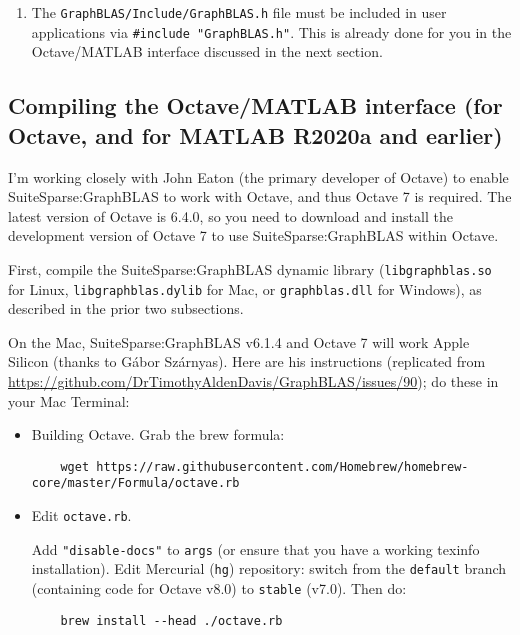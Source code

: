 \documentclass[12pt]{article}
\begin{document}
{\begin{enumerate}
\item The \verb'GraphBLAS/Include/GraphBLAS.h' file must be included in user
    applications via \verb'#include "GraphBLAS.h"'.  This is already done for
    you in the Octave/MATLAB interface discussed in the next section.

\end{enumerate}

\subsection{Compiling the Octave/MATLAB interface (for Octave, and for MATLAB R2020a and earlier)}
\label{gbmake}

I'm working closely with John Eaton (the primary developer of Octave) to
enable SuiteSparse:GraphBLAS to work with Octave, and thus Octave 7 is
required.  The latest version of Octave is 6.4.0, so you need to download and
install the development version of Octave 7 to use SuiteSparse:GraphBLAS within
Octave.

First, compile the SuiteSparse:GraphBLAS dynamic library
(\verb'libgraphblas.so' for Linux, \verb'libgraphblas.dylib' for Mac,
or \verb'graphblas.dll' for Windows), as described in the prior two
subsections.

On the Mac, SuiteSparse:GraphBLAS v6.1.4 and Octave 7 will work 
Apple Silicon (thanks to G{\'{a}}bor Sz{\'{a}}rnyas).  Here are his instructions
(replicated from
\url{https://github.com/DrTimothyAldenDavis/GraphBLAS/issues/90}); do
these in your Mac Terminal:

\begin{itemize}
\item Building Octave.  Grab the brew formula:

    {\scriptsize
    \begin{verbatim}
    wget https://raw.githubusercontent.com/Homebrew/homebrew-core/master/Formula/octave.rb
    \end{verbatim} }

\item Edit \verb'octave.rb'.

   Add \verb`"disable-docs"` to \verb`args` (or ensure that you have a working
   texinfo installation).
   Edit Mercurial (\verb`hg`) repository: switch from the \verb`default` branch
   (containing code for Octave v8.0) to \verb`stable` (v7.0).  Then do:

    {\small
    \begin{verbatim}
    brew install --head ./octave.rb
    \end{verbatim} }


\end{itemize}}
\end{document}
